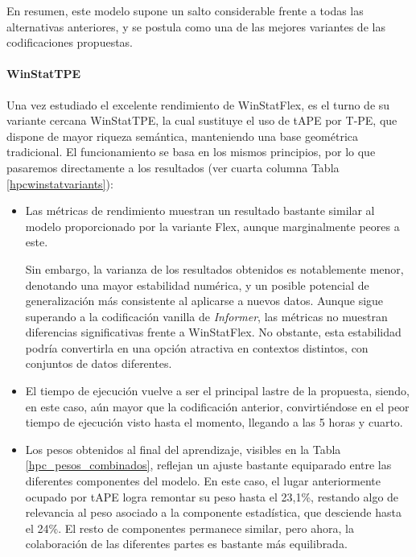En resumen, este modelo supone un salto considerable frente a todas las alternativas anteriores, y se postula como una de las mejores variantes de las codificaciones propuestas.

\paragraph{WinStatTPE}

Una vez estudiado el excelente rendimiento de WinStatFlex, es el turno de su variante cercana WinStatTPE, la cual sustituye el uso de tAPE por T-PE, que dispone de mayor riqueza semántica, manteniendo una base geométrica tradicional. El funcionamiento se basa en los mismos principios, por lo que pasaremos directamente a los resultados (ver cuarta columna Tabla \ref{hpcwinstatvariants}):

\begin{itemize}
	\item Las métricas de rendimiento muestran un resultado bastante similar al modelo proporcionado por la variante Flex, aunque marginalmente peores a este. 
	
	Sin embargo, la varianza de los resultados obtenidos es notablemente menor, denotando una mayor estabilidad numérica, y un posible potencial de generalización más consistente al aplicarse a nuevos datos. Aunque sigue superando a la codificación vanilla de \textit{Informer}, las métricas no muestran diferencias significativas frente a WinStatFlex. No obstante, esta estabilidad podría convertirla en una opción atractiva en contextos distintos, con conjuntos de datos diferentes.
	
	\item El tiempo de ejecución vuelve a ser el principal lastre de la propuesta, siendo, en este caso, aún mayor que la codificación anterior, convirtiéndose en el peor tiempo de ejecución visto hasta el momento, llegando a las 5 horas y cuarto.
	
	\item Los pesos obtenidos al final del aprendizaje, visibles en la Tabla \ref{hpc_pesos_combinados}, reflejan un ajuste bastante equiparado entre las diferentes componentes del modelo. En este caso, el lugar anteriormente ocupado por tAPE logra remontar su peso hasta el 23,1\%, restando algo de relevancia al peso asociado a la componente estadística, que desciende hasta el 24\%. El resto de componentes permanece similar, pero ahora, la colaboración de las diferentes partes es bastante más equilibrada.
\end{itemize}

